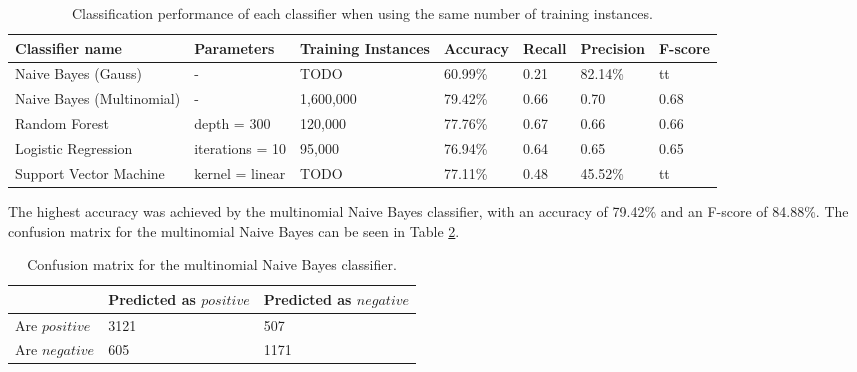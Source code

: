 \begin{table}
\centering
\caption{Classification performance of each classifier when using the same number of training instances.}
\begin{tabular}{ |p{3cm}||p{3cm}|p{2cm}|p{1.5cm}|p{1.5cm}|p{1.5cm}|p{1.5cm}| }
 \hline
 Classifier name &          Parameters &             Training Instances &    Accuracy &      Recall &     Precision& F-score \\
 \hline
 Naive Bayes (Gauss)        &-&            TODO&                 60.99\%&        0.21&       82.14\%& tt\\
  \hline
 Naive Bayes (Multinomial)  &-&                     1,600,000&                79.42\%&        0.66&       0.70& 0.68\\
  \hline
 Random Forest              &depth = 300&            120,000&                 77.76\%&        0.67&       0.66& 0.66\\
  \hline
 Logistic Regression        &iterations = 10&            95,000&                 76.94\%&        0.64&       0.65& 0.65\\
  \hline
 Support Vector Machine     &kernel = linear&            TODO&                 77.11\%&        0.48&       45.52\%& tt\\
 \hline
\end{tabular}
\label{tab:evaluations_euqal}
\end{table}

The highest accuracy was achieved by the multinomial Naive Bayes classifier, with an accuracy of 79.42\% and an F-score of 84.88\%. The confusion matrix for the multinomial Naive Bayes can be seen in Table \ref{tab:evaluations_conf}.
\begin{table}
\centering
\caption{Confusion matrix for the multinomial Naive Bayes classifier.}
\begin{tabular}{ |p{3cm}||p{3cm}|p{3cm}| }
 \hline
  &          Predicted as $positive$ &Predicted as $negative$  \\
 \hline
 Are $positive$        & 3121&            507\\
  \hline
 Are $negative$  &605&                     1171\\
 \hline

\end{tabular}
\label{tab:evaluations_conf}
\end{table}



